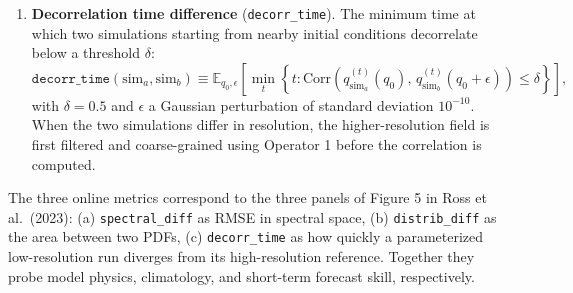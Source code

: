 \documentclass[../SQG_notes.tex]{subfiles}
\begin{document}
\begin{enumerate}
        \item \textbf{Decorrelation time difference} (\texttt{decorr\_time}). The minimum time at which two simulations starting from nearby initial conditions decorrelate below a threshold $\delta$:
        \begin{equation}
            \texttt{decorr\_time}(\text{sim}_a, \text{sim}_b) \equiv \mathbb{E}_{q_0, \epsilon}\!\left[ \min_{t} \left\{ t : \mathrm{Corr}\!\left( q^{(t)}_{\text{sim}_a}(q_0), \, q^{(t)}_{\text{sim}_b}(q_0 + \epsilon) \right) \leq \delta \right\} \right],
        \end{equation}
        with $\delta = 0.5$ and $\epsilon$ a Gaussian perturbation of standard deviation $10^{-10}$. When the two simulations differ in resolution, the higher-resolution field is first filtered and coarse-grained using Operator 1 before the correlation is computed. 
    \end{enumerate}

    \begin{remark}
        The three online metrics correspond to the three panels of Figure 5 in Ross et al.\ (2023): (a) \texttt{spectral\_diff} as RMSE in spectral space, (b) \texttt{distrib\_diff} as the area between two PDFs, (c) \texttt{decorr\_time} as how quickly a parameterized low-resolution run diverges from its high-resolution reference. Together they probe model physics, climatology, and short-term forecast skill, respectively.
    \end{remark}
\end{document}
